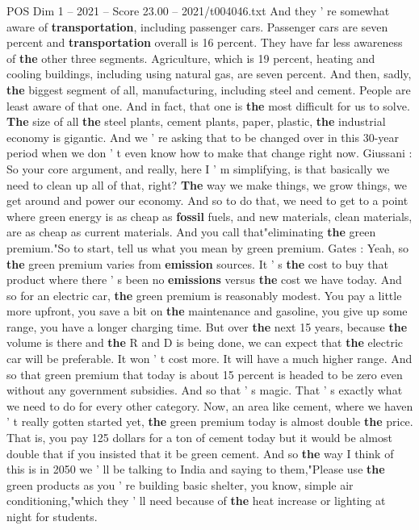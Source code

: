 \begin{textsample}{POS Dim 1 – 2021 – Score 23.00 – 2021/t004046.txt}
And they ' re somewhat aware of \textbf{transportation}, including passenger cars.
Passenger cars are seven percent and \textbf{transportation} overall is 16 percent.
They have far less awareness of \textbf{the} other three segments.
Agriculture, which is 19 percent, heating and cooling buildings, including using natural gas, are seven percent.
And then, sadly, \textbf{the} biggest segment of all, manufacturing, including steel and cement.
People are least aware of that one.
And in fact, that one is \textbf{the} most difficult for us to solve. \textbf{The} size of all \textbf{the} steel plants, cement plants, paper, plastic, \textbf{the} industrial economy is gigantic.
And we ' re asking that to be changed over in this 30-year period when we don ' t even know how to make that change right now.
Giussani : So your core argument, and really, here I ' m simplifying, is that basically we need to clean up all of that, right? \textbf{The} way we make things, we grow things, we get around and power our economy.
And so to do that, we need to get to a point where green energy is as cheap as \textbf{fossil} fuels, and new materials, clean materials, are as cheap as current materials.
And you call that"eliminating \textbf{the} green premium."So to start, tell us what you mean by green premium.
Gates : Yeah, so \textbf{the} green premium varies from \textbf{emission} sources.
It ' s \textbf{the} cost to buy that product where there ' s been no \textbf{emissions} versus \textbf{the} cost we have today.
And so for an electric car, \textbf{the} green premium is reasonably modest.
You pay a little more upfront, you save a bit on \textbf{the} maintenance and gasoline, you give up some range, you have a longer charging time.
But over \textbf{the} next 15 years, because \textbf{the} volume is there and \textbf{the} R and D is being done, we can expect that \textbf{the} electric car will be preferable.
It won ' t cost more.
It will have a much higher range.
And so that green premium that today is about 15 percent is headed to be zero even without any government subsidies.
And so that ' s magic.
That ' s exactly what we need to do for every other category.
Now, an area like cement, where we haven ' t really gotten started yet, \textbf{the} green premium today is almost double \textbf{the} price.
That is, you pay 125 dollars for a ton of cement today but it would be almost double that if you insisted that it be green cement.
And so \textbf{the} way I think of this is in 2050 we ' ll be talking to India and saying to them,"Please use \textbf{the} green products as you ' re building basic shelter, you know, simple air conditioning,"which they ' ll need because of \textbf{the} heat increase or lighting at night for students.

\end{textsample}
